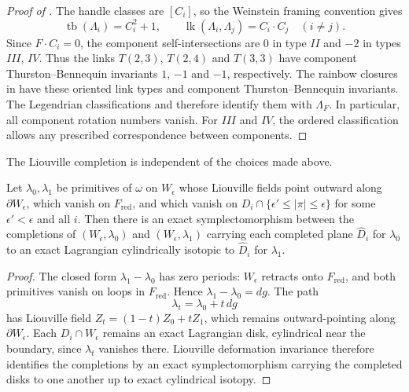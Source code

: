 \documentclass[a4paper]{amsart}
\numberwithin{equation}{section}
\begin{document}
\begin{proof}[Proof of ]
The handle classes are $[C_i]$, so the Weinstein framing convention
\cite{Gompf98} gives
\[
 \operatorname{tb}(\Lambda_i)=C_i^2+1,\qquad
 \operatorname{lk}(\Lambda_i,\Lambda_j)=C_i\cdot C_j\quad(i\ne j).
\]
Since $F\cdot C_i=0$, the component self-intersections are $0$ in type
$II$ and $-2$ in types $III$, $IV$. Thus the links $T(2,3)$, $T(2,4)$
and $T(3,3)$ have component Thurston--Bennequin invariants $1$, $-1$
and $-1$, respectively.
The rainbow closures in  have these oriented
link types and component Thurston--Bennequin invariants. The Legendrian
classifications \cite[Section~4.1]{EtnyreHonda} and
\cite[Theorem~1.1(1)]{DET} therefore identify them with $\Lambda_F$.
In particular, all component rotation numbers vanish. For $III$ and
$IV$, the ordered classification \cite[Theorem~1.2(1)]{DET} allows any
prescribed correspondence between components.
\end{proof}

The Liouville completion is independent of the choices made above.

\begin{proposition}\label{prop:neighbourhood-independence}
Let $\lambda_0,\lambda_1$ be primitives of $\omega$ on $W_\epsilon$ whose
Liouville fields point outward along $\partial W_\epsilon$, which vanish
on $F_{\mathrm{red}}$, and which vanish on
$D_i\cap\{\epsilon'\le|\pi|\le\epsilon\}$ for some $\epsilon'<\epsilon$
and all $i$. Then there is an exact symplectomorphism between the
completions of $(W_\epsilon,\lambda_0)$ and $(W_\epsilon,\lambda_1)$
carrying each completed plane $\widehat D_i$ for $\lambda_0$ to an exact
Lagrangian cylindrically isotopic to $\widehat D_i$ for $\lambda_1$.
\end{proposition}

\begin{proof}
The closed form $\lambda_1-\lambda_0$ has zero periods:
$W_\epsilon$ retracts onto $F_{\mathrm{red}}$, and both primitives
vanish on loops in $F_{\mathrm{red}}$. Hence
$\lambda_1-\lambda_0=dg$. The path
\[
 \lambda_t=\lambda_0+t\,dg
\]
has Liouville field $Z_t=(1-t)Z_0+tZ_1$, which remains outward-pointing
along $\partial W_\epsilon$. Each $D_i\cap W_\epsilon$ remains an
exact Lagrangian disk, cylindrical near the boundary, since
$\lambda_t$ vanishes there. Liouville deformation invariance \cite{CE}
therefore identifies the completions by an exact symplectomorphism
carrying the completed disks to one another up to exact cylindrical
isotopy.
\end{proof}
\end{document}
